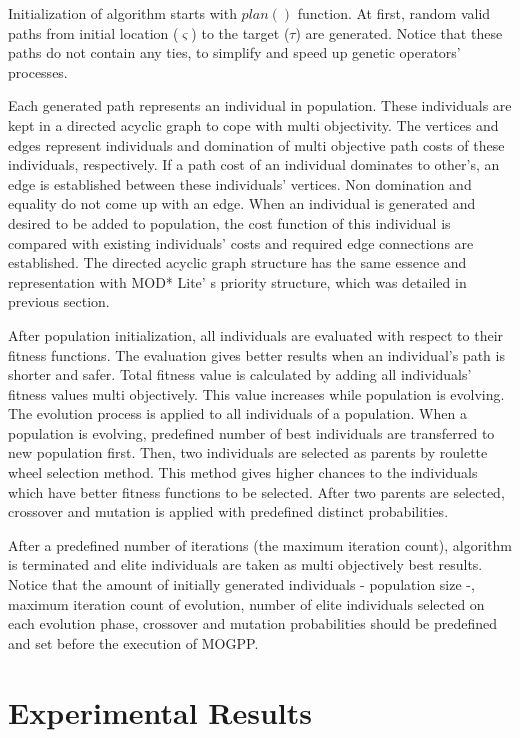 \documentclass[10pt,journal]{IEEEtran}
\begin{document}
Initialization of algorithm starts with $plan()$ function. At first, random valid paths from initial location ($\varsigma$) to the target ($\tau$) are generated. Notice that these paths do not contain any ties, to simplify and speed up genetic operators' processes.

Each generated path represents an individual in population. These individuals are kept in a directed acyclic graph to cope with multi objectivity. The vertices and edges represent individuals and domination of multi objective path costs of these individuals, respectively. If a path cost of an individual dominates to other's, an edge is established between these individuals' vertices. Non domination and equality do not come up with an edge. When an individual is generated and desired to be added to population, the cost function of this individual is compared with existing individuals' costs and required edge connections are established. The directed acyclic graph structure has the same essence and representation with MOD* Lite' s priority structure, which was detailed in previous section.

After population initialization, all individuals are evaluated with respect to their fitness functions. The evaluation gives better results when an individual's path is shorter and safer. Total fitness value is calculated by adding all individuals' fitness values multi objectively. This value increases while population is evolving. The evolution process is applied to all individuals of a population. When a population is evolving, predefined number of best individuals are transferred to new population first. Then, two individuals are selected as parents by roulette wheel selection method. This method gives higher chances to the individuals which have better fitness functions to be selected. After two parents are selected, crossover and mutation is applied with predefined distinct probabilities.

After a predefined number of iterations (the maximum iteration count), algorithm is terminated and elite individuals are taken as multi objectively best results. Notice that the amount of initially generated individuals - population size -, maximum iteration count of evolution, number of elite individuals selected on each evolution phase, crossover and mutation probabilities should be predefined and set before the execution of MOGPP.


\section{Experimental Results}
\label{chapter:experiments}
\end{document}
